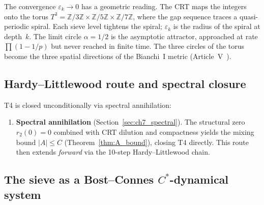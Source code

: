 \documentclass[12pt,a4paper]{article}
\begin{document}
\begin{remark}
\label{rem:toric_spiral}
The convergence $\varepsilon_k \to 0$ has a geometric reading.
The CRT maps the integers onto the torus
$T^3 = \mathbb{Z}/3\mathbb{Z} \times \mathbb{Z}/5\mathbb{Z} \times
\mathbb{Z}/7\mathbb{Z}$, where the gap sequence traces a
quasi-periodic spiral.  Each sieve level tightens the spiral;
$\varepsilon_k$ is the radius of the spiral at depth~$k$.
The limit circle $\alpha = 1/2$ is the asymptotic attractor,
approached at rate $\prod(1 - 1/p)$ but never reached in finite time.
The three circles of the torus become the three spatial directions
of the Bianchi~I metric (Article~V~\cite{companion_M5}).
\end{remark}

\subsection{Hardy--Littlewood route and spectral closure}
\label{sec:ch7_HL}

T4 is closed unconditionally via spectral annihilation:

\begin{enumerate}[leftmargin=3em]
\item \textbf{Spectral annihilation} (Section~\ref{sec:ch7_spectral}).
  The structural zero $r_2(0) = 0$ combined with CRT dilution and
  compactness yields the mixing bound $|A| \leq C$
  (Theorem~\ref{thm:A_bound}), closing T4 directly.
  This route then extends \emph{forward} via the
  10-step Hardy--Littlewood chain.
\end{enumerate}

\subsection{The sieve as a Bost--Connes $C^*$-dynamical system}
\label{sec:ch7_bost_connes}
\end{document}
